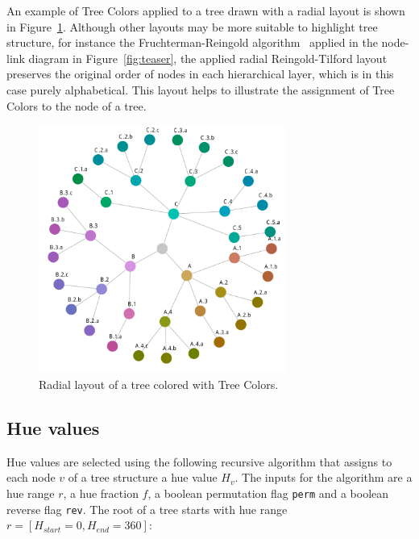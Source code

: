 \documentclass[review,journal]{vgtc}         %
\begin{document}
An example of Tree Colors applied to a tree drawn with a radial layout is shown in Figure~\ref{fig:graph}. 
Although other layouts may be more suitable to highlight tree structure, for instance the Fruchterman-Reingold algorithm~\cite{Fruchterman91} applied in the node-link diagram in Figure~\ref{fig:teaser}, the applied radial Reingold-Tilford layout~\cite{reingold81} preserves the original order of nodes in each hierarchical layer, which is in this case purely alphabetical. This layout helps to illustrate the assignment of Tree Colors to the node of a tree. 

\begin{figure}[tb]

  \centering
  \includegraphics[width=3.2in]{HCPgraph.pdf}
  \caption{Radial layout of a tree colored with Tree Colors.}\label{fig:graph}

\end{figure}

\subsection{Hue values}
Hue values are selected using the following recursive algorithm that assigns to each node 
$v$ of a tree structure a hue value $H_{v}$. 
The inputs for the algorithm are a hue range $r$, a hue fraction $f$, a boolean permutation flag  
\texttt{perm} and a boolean reverse flag \texttt{rev}.
The root of a tree starts with hue range $r=[H_{start}=0, H_{end}=360]$:
\end{document}
